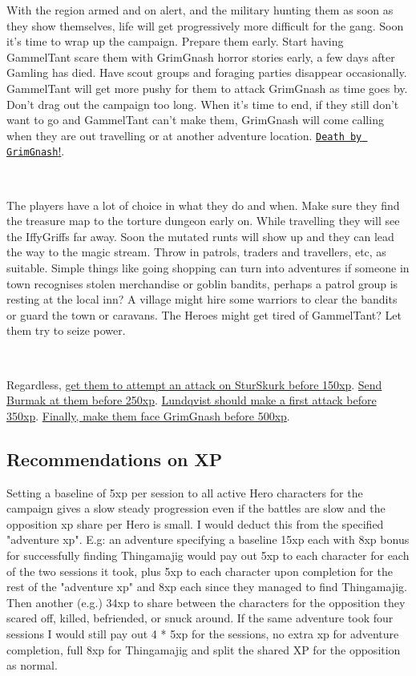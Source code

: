 With the region armed and on alert, and the military hunting them as soon as they show themselves, life will get progressively more difficult for the gang. Soon it's time to wrap up the campaign. Prepare them early. Start having GammelTant scare them with GrimGnash horror stories early, a few days after Gamling has died. Have scout groups and foraging parties disappear occasionally. GammelTant will get more pushy for them to attack GrimGnash as time goes by. Don't drag out the campaign too long. When it's time to end, if they still don't want to go and GammelTant can't make them, GrimGnash will come calling when they are out travelling or at another adventure location. \hyperref[05deathbygrimgnash]{\texttt{Death by GrimGnash}!}.

\

The players have a lot of choice in what they do and when. Make sure they find the treasure map to the torture dungeon early on. While travelling they will see the IffyGriffs far away. Soon the mutated runts will show up and they can lead the way to the magic stream. Throw in patrols, traders and travellers, etc, as suitable. Simple things like going shopping can turn into adventures if someone in town recognises stolen merchandise or goblin bandits, perhaps a patrol group is resting at the local inn? A village might hire some warriors to clear the bandits or guard the town or caravans. The Heroes might get tired of GammelTant? Let them try to seize power.

\

Regardless, 
\hyperref[02killthebandits]{get them to attempt an attack on SturSkurk before 150xp}. 
\hyperref[03defendhoomhool]{Send Burmak at them before 250xp}. 
\hyperref[03defendhoomhool]{Lundqvist should make a first attack before 350xp}. \hyperref[05deathbygrimgnash]{Finally, make them face GrimGnash before 500xp}.


\subsection*{Recommendations on XP}

Setting a baseline of 5xp per session to all active Hero characters for the campaign gives a slow steady progression even if the battles are slow and the opposition xp share per Hero is small. I would deduct this from the specified "adventure xp". E.g: an adventure specifying a baseline 15xp each with 8xp bonus for successfully finding Thingamajig would pay out 5xp to each character for each of the two sessions it took, plus 5xp to each character upon completion for the rest of the "adventure xp" and 8xp each since they managed to find Thingamajig. Then another (e.g.) 34xp to share between the characters for the opposition they scared off, killed, befriended, or snuck around. If the same adventure took four sessions I would still pay out 4 * 5xp for the sessions, no extra xp for adventure completion, full 8xp for Thingamajig and split the shared XP for the opposition as normal.

